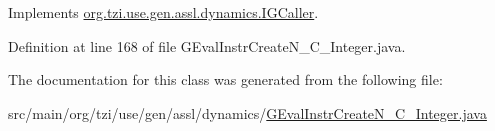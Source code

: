 Implements \hyperlink{interfaceorg_1_1tzi_1_1use_1_1gen_1_1assl_1_1dynamics_1_1_i_g_caller_a8dc6abb36ee44d8e73a0b506764bd1e1}{org.\-tzi.\-use.\-gen.\-assl.\-dynamics.\-I\-G\-Caller}.



Definition at line 168 of file G\-Eval\-Instr\-Create\-N\-\_\-\-C\-\_\-\-Integer.\-java.



The documentation for this class was generated from the following file\-:\begin{DoxyCompactItemize}
\item 
src/main/org/tzi/use/gen/assl/dynamics/\hyperlink{_g_eval_instr_create_n___c___integer_8java}{G\-Eval\-Instr\-Create\-N\-\_\-\-C\-\_\-\-Integer.\-java}\end{DoxyCompactItemize}
